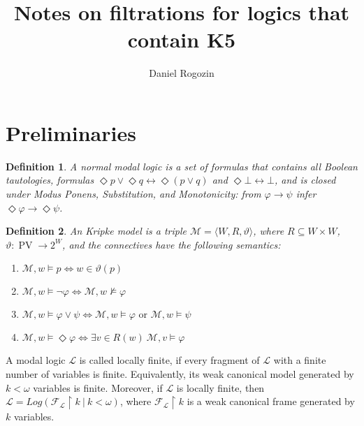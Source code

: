 \documentclass[a4paper]{article}
\author{Daniel Rogozin}
\date{}
\title{Notes on filtrations for logics that contain {\bf K5}}
\theoremstyle{defin}
\newtheorem{defin}{Definition}
\theoremstyle{theorem}
\theoremstyle{prop}
\theoremstyle{lemma}
\theoremstyle{fact}
\theoremstyle{exercise}
\theoremstyle{ex}
\theoremstyle{col}
\theoremstyle{claim}
\begin{document}
\maketitle

\section{Preliminaries}

\begin{defin}
  A normal modal logic is a set of formulas that contains all Boolean tautologies,
  formulas $\Diamond p \lor \Diamond q \leftrightarrow \Diamond (p \lor q)$ and
  $\Diamond \bot \leftrightarrow \bot$, and is closed under Modus Ponens, Substitution, and
  Monotonicity:
  from $\varphi \rightarrow \psi$ infer $\Diamond \varphi \rightarrow \Diamond \psi$.
\end{defin}

\begin{defin} An Kripke model is a triple $\mathcal{M} = \langle W, R, \vartheta \rangle$,
  where $R \subseteq W \times W$, $\vartheta : \operatorname{PV} \to 2^W$, and
  the connectives have the following semantics:

  \begin{enumerate}
    \item $\mathcal{M}, w \models p \Leftrightarrow w \in \vartheta(p)$
    \item $\mathcal{M}, w \models \neg \varphi \Leftrightarrow \mathcal{M}, w \nvDash \varphi$
    \item $\mathcal{M}, w \models \varphi \lor \psi \Leftrightarrow \mathcal{M}, w \models \varphi \text{ or } \mathcal{M}, w \models \psi$
    \item $\mathcal{M}, w \models \Diamond \varphi \Leftrightarrow \exists v \in R(w) \: \mathcal{M}, v \models \varphi$
  \end{enumerate}
\end{defin}

A modal logic $\mathcal{L}$ is called locally finite, if every fragment of $\mathcal{L}$ with a finite number of variables is finite. Equivalently, its weak canonical model generated by $k < \omega$ variables is finite. Moreover, if $\mathcal{L}$ is locally finite, then $\mathcal{L} = Log(\mathcal{F}_{\mathcal{L}} \upharpoonright k \: | \: k < \omega)$, where $\mathcal{F}_{\mathcal{L}} \upharpoonright k$ is a weak canonical frame generated by $k$ variables.
\end{document}
